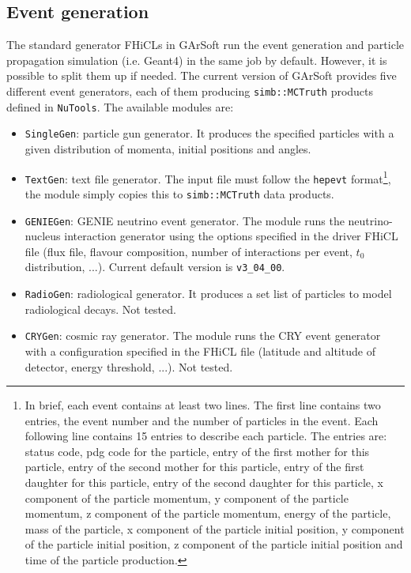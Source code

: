 \subsection{Event generation}

The standard generator FHiCLs in GArSoft run the event generation and particle propagation simulation (i.e. Geant4) in the same job by default. However, it is possible to split them up if needed. The current version of GArSoft provides five different event generators, each of them producing \texttt{simb::MCTruth} products defined in \texttt{NuTools}. The available modules are:
\begin{itemize}
	\item \texttt{SingleGen}: particle gun generator. It produces the specified particles with a given distribution of momenta, initial positions and angles.
	\item \texttt{TextGen}: text file generator. The input file must follow the \texttt{hepevt} format\footnote{In brief, each event contains at least two  lines.  The first line contains two entries, the event number and the number of particles in the event. Each following line contains 15 entries to describe each particle. The entries are: status code, pdg code for the particle, entry of the first mother for this particle, entry of the second mother for this particle, entry of the first daughter for this particle, entry of the second daughter for this particle, x component of the particle momentum, y component of the particle momentum, z component of the particle momentum, energy of the particle, mass of the particle, x component of the particle initial position, y component of the particle initial position, z component of the particle initial position and time of the particle production.}, the module simply copies this to \texttt{simb::MCTruth} data products.
	\item \texttt{GENIEGen}: GENIE neutrino event generator. The module runs the neutrino-nucleus interaction generator using the options specified in the driver FHiCL file (flux file, flavour composition, number of interactions per event, $t_{0}$ distribution, ...). Current default version is \texttt{v3_04_00}.
	\item \texttt{RadioGen}: radiological generator. It produces a set list of particles to model radiological decays. Not tested.
	\item \texttt{CRYGen}: cosmic ray generator. The module runs the CRY event generator with a configuration specified in the FHiCL file (latitude and altitude of detector, energy threshold, ...). Not tested.
\end{itemize}


